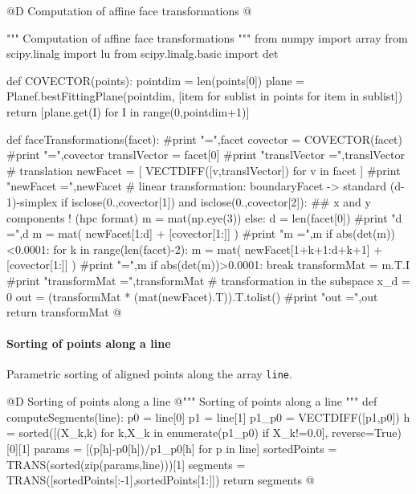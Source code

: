 \documentclass[11pt,oneside]{article}    %
\begin{document}
@D Computation of affine face transformations
@{""" Computation of affine face transformations """
from numpy import array
from scipy.linalg import lu
from scipy.linalg.basic import det

def COVECTOR(points):
    pointdim = len(points[0])
    plane = Planef.bestFittingPlane(pointdim,
                    [item for sublist in points for item in sublist])
    return [plane.get(I) for I in range(0,pointdim+1)]

def faceTransformations(facet):
    #print "\nfacet =",facet
    covector = COVECTOR(facet)
    #print "\ncovector =",covector
    translVector = facet[0]
    #print "translVector =",translVector
    # translation 
    newFacet = [ VECTDIFF([v,translVector]) for v in facet ]
    #print "newFacet =",newFacet
    # linear transformation: boundaryFacet -> standard (d-1)-simplex
    if isclose(0.,covector[1]) and isclose(0.,covector[2]): ## x and y components ! (hpc format)
        m = mat(np.eye(3))
    else:
        d = len(facet[0])
        #print "d =",d
        m = mat( newFacet[1:d] + [covector[1:]] )
        #print "m =",m
        if abs(det(m))<0.0001:
            for k in range(len(facet)-2):
                m = mat( newFacet[1+k+1:d+k+1] + [covector[1:]] )
                #print "\nm =",m
                if abs(det(m))>0.0001: break
    transformMat = m.T.I
    #print "transformMat =",transformMat
    # transformation in the subspace x_d = 0
    out = (transformMat * (mat(newFacet).T)).T.tolist()
    #print "out =",out
    return transformMat
@}
    
\paragraph{Sorting of points along a line}

Parametric sorting of aligned points along the array \texttt{line}. 

@D Sorting of points along a line
@{""" Sorting of points along a line """
def computeSegments(line):
    p0 = line[0]
    p1 = line[1]
    p1_p0 = VECTDIFF([p1,p0])
    h = sorted([(X_k,k) for k,X_k in enumerate(p1_p0) if X_k!=0.0], reverse=True)[0][1]
    params = [(p[h]-p0[h])/p1_p0[h] for p in line]
    sortedPoints = TRANS(sorted(zip(params,line)))[1]
    segments = TRANS([sortedPoints[:-1],sortedPoints[1:]])
    return segments
@}
\end{document}
